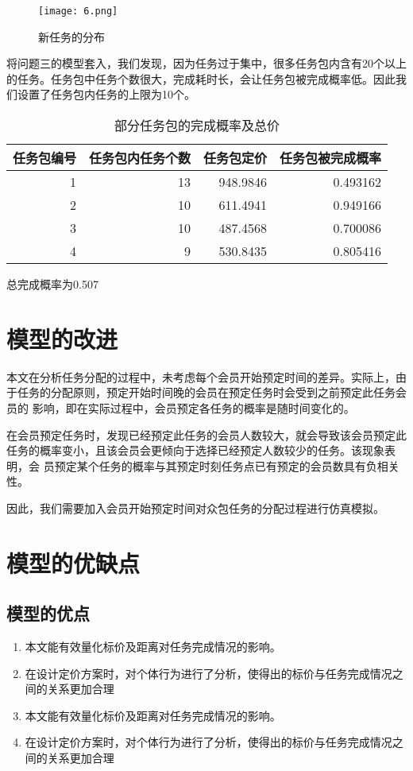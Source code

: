 \documentclass{cumcmthesis}
\begin{document}
\begin{figure}[!htbp]
	\centering
	\texttt{[image: 6.png]}
	\caption{新任务的分布}\label{Fig:5}
\end{figure}
将问题三的模型套入，我们发现，因为任务过于集中，很多任务包内含有20个以上的任务。任务包中任务个数很大，完成耗时长，会让任务包被完成概率低。因此我们设置了任务包内任务的上限为10个。
\begin{table}[!htbp]
 \centering
	\caption{ 部分任务包的完成概率及总价}\label{Tab:9}
	\begin{tabular}{rrrr}
		\toprule[1.5pt]
		\multicolumn{1}{l}{任务包编号} & \multicolumn{1}{l}{任务包内任务个数} & \multicolumn{1}{l}{任务包定价} & \multicolumn{1}{l}{任务包被完成概率} \\
		\midrule[1pt]
		1     & 13    & 948.9846 & 0.493162 \\
		2     & 10    & 611.4941 & 0.949166 \\
		3     & 10    & 487.4568 & 0.700086 \\
		4     & 9     & 530.8435 & 0.805416 \\
		\bottomrule[1.5pt]
	\end{tabular}%
\end{table}
总完成概率为0.507

\section{模型的改进}
本文在分析任务分配的过程中，未考虑每个会员开始预定时间的差异。实际上，由 于任务的分配原则，预定开始时间晚的会员在预定任务时会受到之前预定此任务会员的 影响，即在实际过程中，会员预定各任务的概率是随时间变化的。

在会员预定任务时，发现已经预定此任务的会员人数较大，就会导致该会员预定此 任务的概率变小，且该会员会更倾向于选择已经预定人数较少的任务。该现象表明，会 员预定某个任务的概率与其预定时刻任务点已有预定的会员数具有负相关性。 

因此，我们需要加入会员开始预定时间对众包任务的分配过程进行仿真模拟。

\section{模型的优缺点}
\subsection{模型的优点}
\begin{enumerate}
\item 本文能有效量化标价及距离对任务完成情况的影响。 
\item 在设计定价方案时，对个体行为进行了分析，使得出的标价与任务完成情况之 间的关系更加合理
\item 本文能有效量化标价及距离对任务完成情况的影响。 
\item 在设计定价方案时，对个体行为进行了分析，使得出的标价与任务完成情况之 间的关系更加合理
\end{enumerate}
\end{document}
